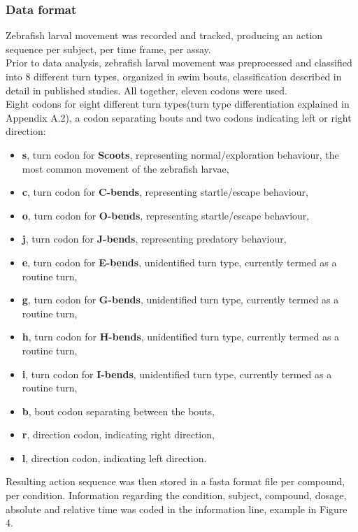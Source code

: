\documentclass[a4paper,12pt]{article}
\begin{document}
\subsubsection{Data format}
Zebrafish larval movement was recorded and tracked, producing an action sequence per subject, per time frame, per assay. \\Prior to data analysis, zebrafish larval movement was preprocessed and classified into 8 different turn types, organized in swim bouts, classification described in detail in published studies\cite{ref18}. All together, eleven codons were used. \\Eight codons for eight different turn types(turn type differentiation explained in Appendix A.2), a codon separating bouts and two codons indicating left or right direction:
\begin{itemize}
\item \textbf{s}, turn codon for \textbf{Scoots}, representing normal/exploration behaviour, the most common movement of the zebrafish larvae,
\item \textbf{c}, turn codon for \textbf{C-bends}, representing startle/escape behaviour,
\item \textbf{o}, turn codon for \textbf{O-bends}, representing startle/escape behaviour, 
\item \textbf{j}, turn codon for \textbf{J-bends}, representing predatory behaviour,
\item \textbf{e}, turn codon for \textbf{E-bends}, unidentified turn type, currently termed as a routine turn,
\item \textbf{g}, turn codon for \textbf{G-bends}, unidentified turn type, currently termed as a routine turn, 
\item \textbf{h}, turn codon for \textbf{H-bends}, unidentified turn type, currently termed as a routine turn, 
\item \textbf{i}, turn codon for \textbf{I-bends}, unidentified turn type, currently termed as a routine turn,  
\item \textbf{b}, bout codon separating between the bouts,  
\item \textbf{r}, direction codon, indicating right direction,  
\item \textbf{l}, direction codon, indicating left direction. 
\end{itemize}
Resulting action sequence was then stored in a fasta format file per compound, per condition. Information regarding the condition, subject, compound, dosage, absolute and relative time was coded in the information line, example in Figure 4.
\end{document}

